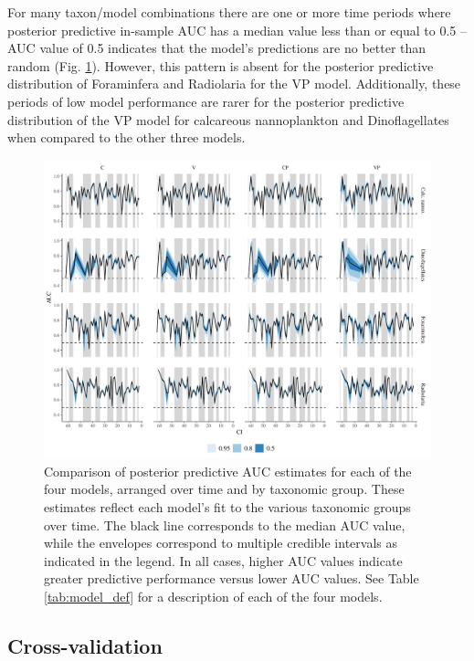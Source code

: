 \documentclass[12pt,letterpaper]{article}
\begin{document}
For many taxon/model combinations there are one or more time periods where posterior predictive in-sample AUC has a median value less than or equal to 0.5 -- AUC value of 0.5 indicates that the model's predictions are no better than random (Fig. \ref{fig:auc_taxon_time}). However, this pattern is absent for the posterior predictive distribution of Foraminfera and Radiolaria for the VP model. Additionally, these periods of low model performance are rarer for the posterior predictive distribution of the VP model for calcareous nannoplankton and Dinoflagellates when compared to the other three models.
\begin{figure}[ht]
  \centering
  \includegraphics[width=\textwidth,height=0.5\textheight,keepaspectratio=true]{../results/figure/auc_taxon_time_full}
  \caption{Comparison of posterior predictive AUC estimates for each of the four models, arranged over time and by taxonomic group. These estimates reflect each model's fit to the various taxonomic groups over time. The black line corresponds to the median AUC value, while the envelopes correspond to multiple credible intervals as indicated in the legend. In all cases, higher AUC values indicate greater predictive performance versus lower AUC values. See Table \ref{tab:model_def} for a description of each of the four models.}
  \label{fig:auc_taxon_time}
\end{figure}




\subsection{Cross-validation}
\end{document}
